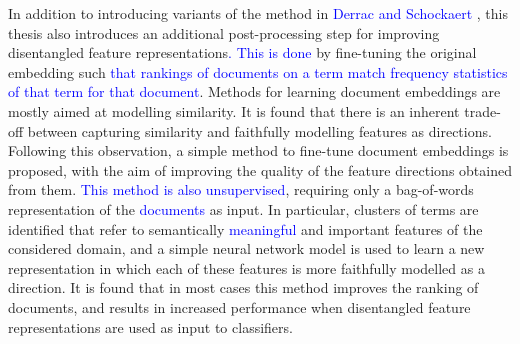 \documentclass[a4paper,oneside,onecolumn,openright,12pt]{book}
\newcommand\hmark[1]{\textcolor{blue}{#1}}
\begin{document}
 In addition to introducing variants of the method in \hmark{Derrac and Schockaert} \cite{Derrac2015}, this thesis also introduces an additional post-processing step for improving disentangled feature representations\hmark{. This is done} by fine-tuning the original embedding such \hmark{that rankings of documents on a term match frequency statistics of that term for that document}. Methods for learning document embeddings  are mostly aimed at modelling similarity. It is found  that there is an inherent trade-off between capturing similarity and faithfully modelling features as directions. Following this observation, a simple method to fine-tune  document embeddings is proposed, with the aim of improving the quality of the feature directions obtained from them. \hmark{This  method is also  unsupervised}, requiring only a bag-of-words representation of the \hmark{documents} as input.  In particular,  clusters of terms are identified that refer to semantically \hmark{meaningful} and important features of the considered domain, and a simple neural network model is used to learn a new representation in which each of these features is more faithfully modelled as a direction. It is found that in most cases this method improves the ranking of documents, and results in increased performance when disentangled feature representations are used as input to classifiers. %






\end{document}
